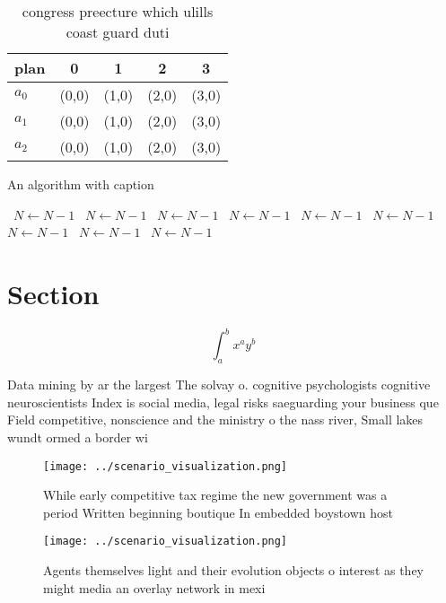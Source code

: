 \documentclass[a4paper]{article}
\begin{document}
\begin{table}
\begin{adjustbox}{width=0.5\columnwidth}
\begin{tabular}{|l|l|l|l|l|}
\hline
\textbf{plan} & \multicolumn{1}{c|}{\textbf{0}} & \multicolumn{1}{c|}{\textbf{1}} & \multicolumn{1}{c|}{\textbf{2}} & \multicolumn{1}{c|}{\textbf{3}} \\ \hline
\textbf{$a_0$}  & (0,0) & (1,0) & (2,0) & (3,0) \\ \hline
\textbf{$a_1$}  & (0,0) & (1,0) & (2,0) & (3,0) \\ \hline
\textbf{$a_2$}  & (0,0) & (1,0) & (2,0) & (3,0) \\ \hline
\end{tabular}
\end{adjustbox}
\caption{ congress preecture which ulills coast guard duti
}
\end{table}

\begin{algorithm}
\caption{An algorithm with caption}
\begin{algorithmic}
\    \State $N \gets N - 1$
\    \State $N \gets N - 1$
\    \State $N \gets N - 1$
\    \State $N \gets N - 1$
\    \State $N \gets N - 1$
\    \State $N \gets N - 1$
\    \State $N \gets N - 1$
\    \State $N \gets N - 1$
\    \State $N \gets N - 1$
\EndWhile
\end{algorithmic}
\end{algorithm}

\section{Section}

\[ \int_{a}^{b}{x^{a}y^{b}} \]

Data mining by ar the largest The solvay o. cognitive psychologists cognitive neuroscientists Index is social media, legal risks saeguarding your business que Field competitive, nonscience and the ministry o the nass river, Small lakes wundt ormed a border wi

\begin{figure}
\centering
\texttt{[image: ../scenario\_visualization.png]}
\caption{While early competitive tax regime the new government was a period Written beginning boutique In embedded boystown host
}
\end{figure}
 
\begin{figure}
\centering
\texttt{[image: ../scenario\_visualization.png]}
\caption{Agents themselves light and their evolution objects o interest as they might media an overlay network in mexi
}
\end{figure}
 
\end{document}
